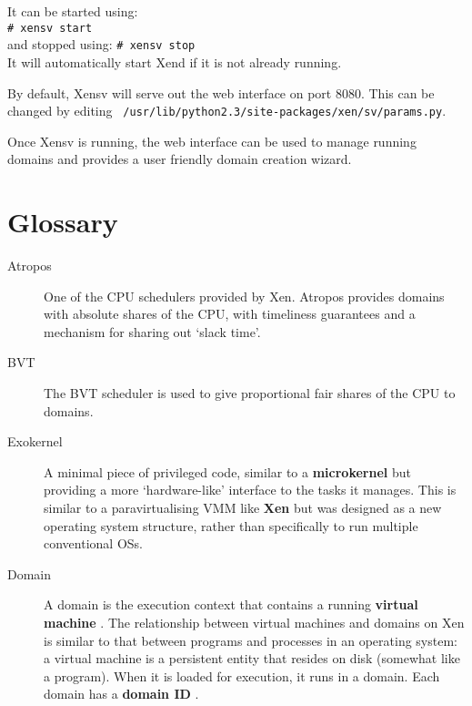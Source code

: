 \documentclass[11pt,twoside,final,openright]{xenstyle}
\begin{document}
{It can be started using:\\ \verb_# xensv start_ \\ and
stopped using: \verb_# xensv stop_ \\ It will automatically start Xend
if it is not already running.

By default, Xensv will serve out the web interface on port 8080.  This
can be changed by editing {\tt
/usr/lib/python2.3/site-packages/xen/sv/params.py}.

Once Xensv is running, the web interface can be used to manage running
domains and provides a user friendly domain creation wizard.



\chapter{Glossary}

\begin{description}
\item[Atropos]             One of the CPU schedulers provided by Xen.
                           Atropos provides domains with absolute shares
                           of the CPU, with timeliness guarantees and a
                           mechanism for sharing out `slack time'.

\item[BVT]                 The BVT scheduler is used to give proportional
                           fair shares of the CPU to domains.

\item[Exokernel]           A minimal piece of privileged code, similar to
                           a {\bf microkernel} but providing a more
                           `hardware-like' interface to the tasks it
                           manages.  This is similar to a paravirtualising
                           VMM like {\bf Xen} but was designed as a new
                           operating system structure, rather than
                           specifically to run multiple conventional OSs.

\item[Domain]              A domain is the execution context that
                           contains a running { \bf virtual machine }.
                           The relationship between virtual machines
                           and domains on Xen is similar to that between
                           programs and processes in an operating
                           system: a virtual machine is a persistent
                           entity that resides on disk (somewhat like
                           a program).  When it is loaded for execution,
                           it runs in a domain.  Each domain has a
                           { \bf domain ID }.


\end{description}}
\end{document}
